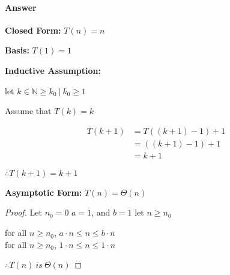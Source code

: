 \documentclass{article}
\begin{document}
\paragraph{Answer}

{\bf Closed Form:} $T (n) = n$

{\bf Basis:} $T (1) = 1$

{\bf Inductive Assumption:}

let $k \in \mathbb{N} \geq k_{0}\ |\ k_{0} \geq 1$

Assume that $T (k) = k$

\begin{align*}
    T (k + 1) &= T((k+1)-1) +1\\
    &= ((k+1) -1 ) +1\\
    &= k + 1
\end{align*}

$\therefore T(k+1)=k+1$

{\bf Asymptotic Form:} $T(n)=\Theta(n)$

\begin{proof}

    Let $n_{0} = 0$
$a=1$, and $b= 1$
let $n \geq n_{0}$

for all $n \geq n_{0}$, $a \cdot n \leq n \leq b \cdot n$\\
for all $n \geq n_{0}$, $1 \cdot n \leq n \leq 1 \cdot n$

$\therefore T(n)\ is\ \Theta(n)$

\end{proof}




\collab{\todo{}}
\end{document}
